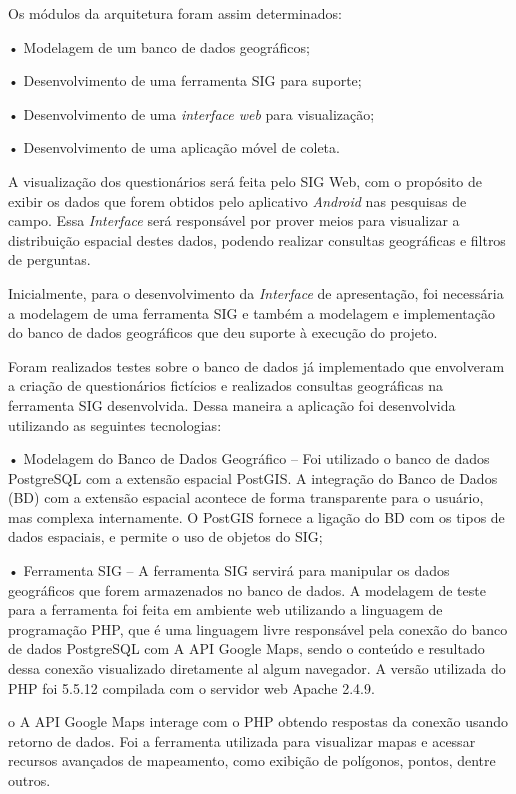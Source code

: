 \documentclass[
	12pt,				%
    oneside,			%
	a4paper,			%
	english,			%
	french,				%
	spanish,			%
	brazil,				%
	]{abntex2}
\begin{document}
Os módulos da arquitetura foram assim determinados: 

•	Modelagem de um banco de dados geográficos; 

•	Desenvolvimento de uma ferramenta SIG para suporte;

•	Desenvolvimento de uma \textit{interface web} para visualização;

•	Desenvolvimento de uma aplicação móvel de coleta.


A visualização dos questionários será feita pelo SIG Web, com o propósito de exibir os dados que forem obtidos pelo aplicativo \textit{Android} nas pesquisas de campo. Essa \textit{Interface} será responsável por prover meios para visualizar a distribuição espacial destes dados, podendo realizar consultas geográficas e filtros de perguntas.

Inicialmente, para o desenvolvimento da \textit{Interface} de apresentação, foi necessária a modelagem de uma ferramenta SIG e também a modelagem e implementação do banco de dados geográficos que deu suporte à execução do projeto. 

Foram realizados testes sobre o banco de dados já implementado que envolveram a criação de questionários fictícios e realizados consultas geográficas na ferramenta SIG desenvolvida. Dessa maneira a aplicação foi desenvolvida utilizando as seguintes tecnologias:

•	Modelagem do Banco de Dados Geográfico – Foi utilizado o banco de dados PostgreSQL com a extensão espacial PostGIS. A integração do Banco de Dados (BD) com a extensão espacial acontece de forma transparente para o usuário, mas complexa internamente. O PostGIS fornece a ligação do BD com os tipos de dados espaciais, e permite o uso de objetos do SIG;

•	Ferramenta SIG – A ferramenta SIG servirá para manipular os dados geográficos que forem armazenados no banco de dados. A modelagem de teste para a ferramenta foi feita em ambiente web utilizando a linguagem de programação PHP, que é uma linguagem livre responsável pela conexão do banco de dados PostgreSQL com A API Google Maps, sendo o conteúdo e resultado dessa conexão visualizado diretamente al algum navegador. A versão utilizada do PHP foi 5.5.12 compilada com o servidor web Apache 2.4.9.

o	A API Google Maps interage com o PHP obtendo respostas da conexão usando retorno de dados. Foi a ferramenta utilizada para visualizar mapas e acessar recursos avançados de mapeamento, como exibição de polígonos, pontos, dentre outros.
\end{document}
